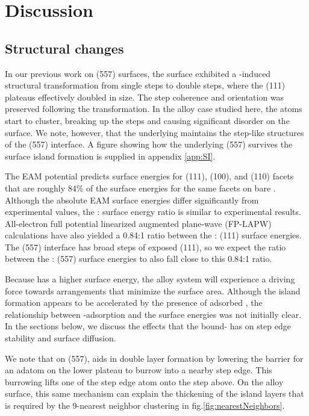 \section{Discussion}

\subsection{Structural changes}

In our previous work on (557) surfaces,\citep{Michalka:2013aa} the
surface exhibited a -induced structural transformation from
single steps to double steps, where the (111) plateaus effectively
doubled in size. The step coherence and orientation was preserved
following the transformation.  In the alloy case studied here, the
 atoms start to cluster, breaking up the steps and causing
significant disorder on the surface.  We note, however, that the
underlying  maintains the step-like structures of the (557)
interface.  A figure showing how the underlying (557) survives
the surface island formation is supplied in appendix \ref{app:SI}.


The EAM potential predicts surface energies for  (111), (100),
and (110) facets that are roughly 84\% of the surface energies for the
same facets on bare .\citep{Foiles:1986ky} Although the absolute EAM
surface energies differ significantly from experimental values, the
: surface energy ratio is similar to experimental
results.\citep{Tyson:1977xe, De-Boer:1988tg} All-electron full potential
linearized augmented plane-wave (FP-LAPW) calculations have also
yielded a 0.84:1 ratio between the : (111) surface
energies.\citep{Silva:2006fk} The (557) interface has broad steps of
exposed (111), so we expect the ratio between the :
(557) surface energies to also fall close to this 0.84:1 ratio.

Because  has a higher surface energy, the alloy system will
experience a driving force towards arrangements that minimize the
 surface area.  Although the  island formation appears
to be accelerated by the presence of adsorbed , the
relationship between -adsorption and the surface energies was
not initially clear. In the sections below, we discuss the effects
that the bound- has on step edge stability and surface
diffusion.

We note that on (557),  aids in double layer formation
by lowering the barrier for an adatom on the lower plateau to burrow
into a nearby step edge.\citep{Michalka:2013aa} This burrowing lifts one
of the step edge atom onto the step above.  On the alloy surface, this
same mechanism can explain the thickening of the  island layers
that is required by the 9-nearest neighbor clustering in
fig.\ref{fig:nearestNeighbors}.

